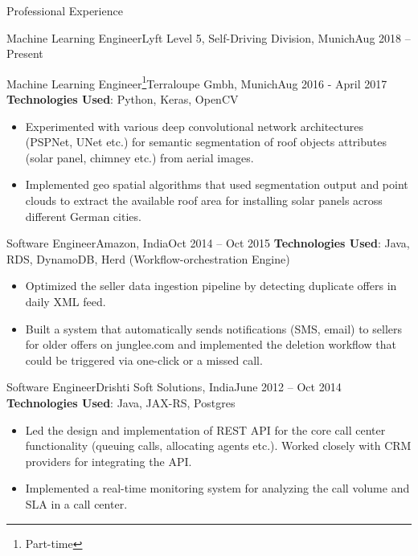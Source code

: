 \documentclass[]{mcdowellcv}
\begin{document}
\begin{cvsection}{Professional Experience}
\begin{cvsubsection}{Machine Learning Engineer}{Lyft Level 5, Self-Driving Division, Munich}{Aug 2018 -- Present}
		\end{cvsubsection}
		
		
		\begin{cvsubsection}{Machine Learning Engineer\footnote{Part-time}}{Terraloupe Gmbh, Munich}{Aug 2016 - April 2017}
			\textbf{Technologies Used}: Python, Keras, OpenCV
			\begin{itemize}
				\item Experimented with various deep convolutional network architectures (PSPNet, UNet etc.) for semantic segmentation of roof objects attributes (solar panel, chimney etc.) from aerial images.
				\item Implemented geo spatial algorithms that used segmentation output and point clouds to extract the available roof area for installing solar panels across different German cities.
			\end{itemize}
		\end{cvsubsection}
		
		
		\begin{cvsubsection}{Software Engineer}{Amazon, India}{Oct 2014 -- Oct 2015}  
			\textbf{Technologies Used}: Java, RDS, DynamoDB, Herd (Workflow-orchestration Engine)
			\begin{itemize}
				\item Optimized the seller data ingestion pipeline by detecting duplicate offers in daily XML feed.
				\item Built a system that automatically sends notifications (SMS, email) to sellers for older offers on junglee.com and implemented the deletion
				workflow that could be triggered via one-click or a missed call.
			\end{itemize}
		\end{cvsubsection}
		
		\begin{cvsubsection}{Software Engineer}{Drishti Soft Solutions, India}{June 2012 -- Oct 2014}
			\textbf{Technologies Used}: Java, JAX-RS, Postgres
			\begin{itemize} 
				\item Led the design and implementation of REST API for the core call center functionality (queuing calls, allocating agents etc.). Worked closely with CRM providers for integrating the API.
				\item Implemented a real-time monitoring system for analyzing the call volume and SLA in a call center. 
			\end{itemize}
		\end{cvsubsection}
	\end{cvsection}
	
\end{document}
